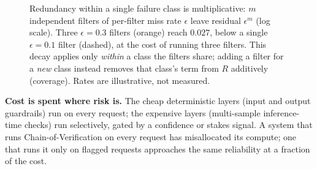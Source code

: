 \documentclass[11pt]{article}
\begin{document}
\begin{figure}[t]
\centering
{}
\caption{Redundancy within a single failure class is multiplicative: $m$
independent filters of per-filter miss rate $\epsilon$ leave residual
$\epsilon^{m}$ (log scale). Three $\epsilon=0.3$ filters (orange) reach $0.027$,
below a single $\epsilon=0.1$ filter (dashed), at the cost of running three
filters. This decay applies only \emph{within} a class the filters share; adding a
filter for a \emph{new} class instead removes that class's term from $R$ additively
(coverage). Rates are illustrative, not measured.}
\label{fig:residual}
\end{figure}

\textbf{Cost is spent where risk is.} The cheap deterministic layers (input and
output guardrails) run on every request; the expensive layers (multi-sample
inference-time checks) run selectively, gated by a confidence or stakes signal.
A system that runs Chain-of-Verification on every request has misallocated its
compute; one that runs it only on flagged requests approaches the same
reliability at a fraction of the cost.
\end{document}
